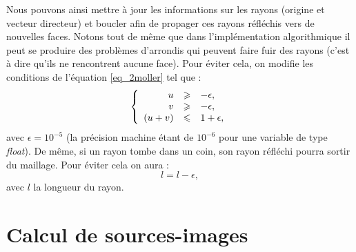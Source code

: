 Nous pouvons ainsi mettre à jour les informations sur les rayons (origine et vecteur directeur) et boucler afin de propager ces rayons réfléchis vers de nouvelles faces. Notons tout de même que dans l'implémentation algorithmique il peut se produire des problèmes d'arrondis qui peuvent faire fuir des rayons (c'est à dire qu'ils ne rencontrent aucune face). Pour éviter cela, on modifie les conditions de l'équation \ref{eq_2moller} tel que :
\begin{equation}
   \left \{
   \begin{array}{r c l}
u & \geqslant & -\epsilon,  \\
v & \geqslant & -\epsilon,  \\
(u+v) & \leqslant & 1+\epsilon,
   \end{array}
   \right .
\end{equation}
avec $\epsilon = 10^{-5}$ (la précision machine étant de $10^{-6}$ pour une variable de type \textit{float}). De même, si un rayon tombe dans un coin, son rayon réfléchi pourra sortir du maillage. Pour éviter cela on aura :
\begin{equation*}
l = l- \epsilon,
\end{equation*}
avec $l$ la longueur du rayon.




\section{Calcul de sources-images} \label{sect_si}



